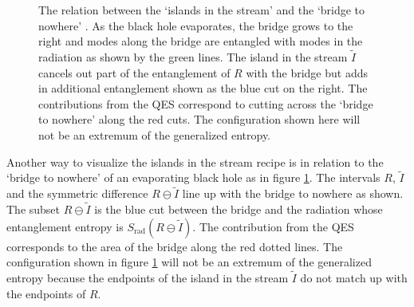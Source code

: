 \documentclass[12pt]{article}
\begin{document}
\begin{figure}
\begin{center}
\end{center}
\caption{\footnotesize The relation between the `islands in the  stream' and the `bridge to nowhere'  \cite{Maldacena:2013xja,Brown:2019rox}. As the black hole evaporates, the bridge grows to the right and modes along the bridge are entangled with modes in the radiation as shown by the green lines. The island in the stream $\tilde I$ cancels out part of the entanglement  of $R$ with the bridge but adds in additional entanglement shown as the blue cut on the right. The contributions from the QES correspond to cutting across the `bridge to nowhere' along the red cuts. The configuration shown here will not be an extremum of the generalized entropy.}
\label{fig2} 
\end{figure}

Another way to visualize the islands in the stream recipe is in relation to the `bridge to nowhere' of an evaporating black hole \cite{Brown:2019rox} as in figure \ref{fig2}. The intervals $R$, $\tilde I$ and the symmetric difference $R\ominus\tilde I$ line up with the bridge to nowhere as shown. The subset $R\ominus\tilde I$ is the blue cut between the bridge and the radiation whose entanglement entropy is $S_\text{rad}(R\ominus\tilde  I)$. The contribution from the QES corresponds to the area of the  bridge along the red dotted lines. The configuration shown in figure \ref{fig2} will not be an extremum of the generalized entropy because the endpoints of the island in the stream $\tilde I$ do not match up with the endpoints of $R$.
\end{document}
